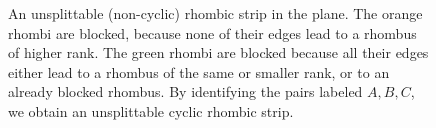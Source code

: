 \documentclass[fontsize=11pt,a4paper,DIV=12]{scrartcl}
\begin{document}
\begin{figure}
	\centering
	
	\caption{An unsplittable (non-cyclic) rhombic strip in the plane. The orange rhombi are blocked, because none of their edges lead to a rhombus of higher rank. The green rhombi are blocked because all their edges either lead to a rhombus of the same or smaller rank, or to an already blocked rhombus. By identifying the pairs labeled $A,B,C$, we obtain an unsplittable cyclic rhombic strip.}
	\label{fig:atomic plane}
\end{figure}
\end{document}
